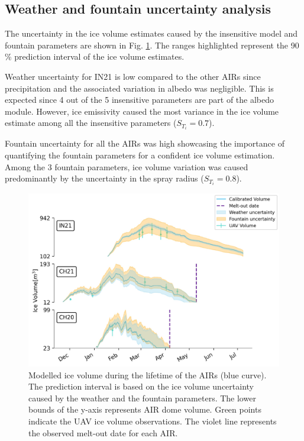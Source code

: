 \documentclass[utf8]{frontiersSCNS} %
\begin{document}
\subsection{Weather and fountain uncertainty analysis}

The uncertainty in the ice volume estimates caused by the insensitive model and fountain parameters are shown in
Fig. \ref{fig:results}. The ranges highlighted represent the 90 \% prediction interval of the ice volume estimates.

Weather uncertainty for IN21 is low compared to the other AIRs since precipitation and the associated variation in
albedo was negligible. This is expected since 4 out of the 5 insensitive parameters are part of the albedo module.
However, ice emissivity caused the most variance in the ice volume estimate among all the insensitive parameters
($S_{T_{i}} = 0.7$).

Fountain uncertainty for all the AIRs was high showcasing the importance of quantifying the fountain parameters for
a confident ice volume estimation. Among the 3 fountain parameters, ice volume variation was caused predominantly
by the uncertainty in the spray radius ($S_{T_{i}} = 0.8$).

\begin{figure}
	\begin{center}
		\includegraphics[width=\linewidth]{Figures/icev_results.jpg}
	\end{center}
	\caption{Modelled ice volume during the lifetime of the AIRs (blue curve). The prediction interval is based on the
		ice volume uncertainty caused by the weather and the fountain parameters. The lower bounds of the y-axis
		represents AIR dome volume. Green points indicate the UAV ice volume observations.  The violet line represents the
		observed melt-out date for each AIR.  }

	\label{fig:results}
\end{figure}
\end{document}
